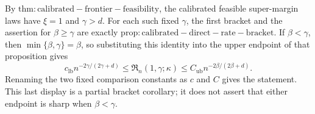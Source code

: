 By \(\mathrm{thm:calibrated-frontier-feasibility}\), the calibrated feasible super-margin laws have \(\xi=1\) and \(\gamma>d\). For each such fixed \(\gamma\), the first bracket and the assertion for \(\beta\ge\gamma\) are exactly \(\mathrm{prop:calibrated-direct-rate-bracket}\). If \(\beta<\gamma\), then \(\min\{\beta,\gamma\}=\beta\), so substituting this identity into the upper endpoint of that proposition gives
\[
c_{\mathrm{lb}}n^{-2\gamma/(2\gamma+d)}
\le\mathfrak R_n(1,\gamma;\kappa)
\le C_{\mathrm{ub}}n^{-2\beta/(2\beta+d)}.
\]
Renaming the two fixed comparison constants as \(c\) and \(C\) gives the statement. This last display is a partial bracket corollary; it does not assert that either endpoint is sharp when \(\beta<\gamma\).